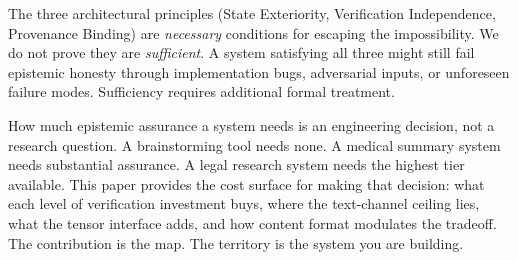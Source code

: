  The three architectural principles (State
Exteriority, Verification Independence, Provenance Binding) are \emph{necessary}
conditions for escaping the impossibility. We do not prove they are
\emph{sufficient}. A system satisfying all three might still fail epistemic
honesty through implementation bugs, adversarial inputs, or unforeseen failure
modes. Sufficiency requires additional formal treatment.

How much epistemic assurance a system needs is an engineering decision, not a
research question. A brainstorming tool needs none. A medical summary system
needs substantial assurance. A legal research system needs the highest
tier available. This paper provides the cost surface for making that decision:
what each level of verification investment buys, where the text-channel ceiling
lies, what the tensor interface adds, and how content format modulates the
tradeoff. The contribution is the map. The territory is the system you are
building.
